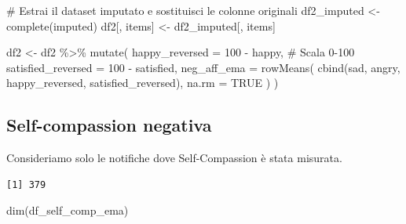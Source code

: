 \documentclass[
  11pt,
  a4paper,
  onecolumn]{article}
\newenvironment{Shaded}{}{}
\newcommand{\AttributeTok}[1]{\textcolor[rgb]{0.84,0.23,0.29}{#1}}
\newcommand{\CommentTok}[1]{\textcolor[rgb]{0.42,0.45,0.49}{#1}}
\newcommand{\ConstantTok}[1]{\textcolor[rgb]{0.00,0.36,0.77}{#1}}
\newcommand{\DecValTok}[1]{\textcolor[rgb]{0.00,0.36,0.77}{#1}}
\newcommand{\FunctionTok}[1]{\textcolor[rgb]{0.44,0.26,0.76}{#1}}
\newcommand{\NormalTok}[1]{\textcolor[rgb]{0.14,0.16,0.18}{#1}}
\newcommand{\OtherTok}[1]{\textcolor[rgb]{0.44,0.26,0.76}{#1}}
\newcommand{\SpecialCharTok}[1]{\textcolor[rgb]{0.00,0.36,0.77}{#1}}
\begin{document}
\begin{Shaded}
\begin{Highlighting}[]
\CommentTok{\# Estrai il dataset imputato e sostituisci le colonne originali}
\NormalTok{df2\_imputed }\OtherTok{\textless{}{-}} \FunctionTok{complete}\NormalTok{(imputed)}
\NormalTok{df2[, items] }\OtherTok{\textless{}{-}}\NormalTok{ df2\_imputed[, items]}

\NormalTok{df2 }\OtherTok{\textless{}{-}}\NormalTok{ df2 }\SpecialCharTok{\%\textgreater{}\%}
  \FunctionTok{mutate}\NormalTok{(}
    \AttributeTok{happy\_reversed =} \DecValTok{100} \SpecialCharTok{{-}}\NormalTok{ happy, }\CommentTok{\# Scala 0{-}100}
    \AttributeTok{satisfied\_reversed =} \DecValTok{100} \SpecialCharTok{{-}}\NormalTok{ satisfied,}
    \AttributeTok{neg\_aff\_ema =} \FunctionTok{rowMeans}\NormalTok{(}
      \FunctionTok{cbind}\NormalTok{(sad, angry, happy\_reversed, satisfied\_reversed),}
      \AttributeTok{na.rm =} \ConstantTok{TRUE}
\NormalTok{    )}
\NormalTok{  )}
\end{Highlighting}
\end{Shaded}

\subsection{Self-compassion negativa}\label{self-compassion-negativa}

Consideriamo solo le notifiche dove Self-Compassion è stata misurata.

\begin{Shaded}
\end{Shaded}

\begin{verbatim}
[1] 379
\end{verbatim}

\begin{Shaded}
\begin{Highlighting}[]
\FunctionTok{dim}\NormalTok{(df\_self\_comp\_ema)}
\end{Highlighting}
\end{Shaded}
\end{document}
